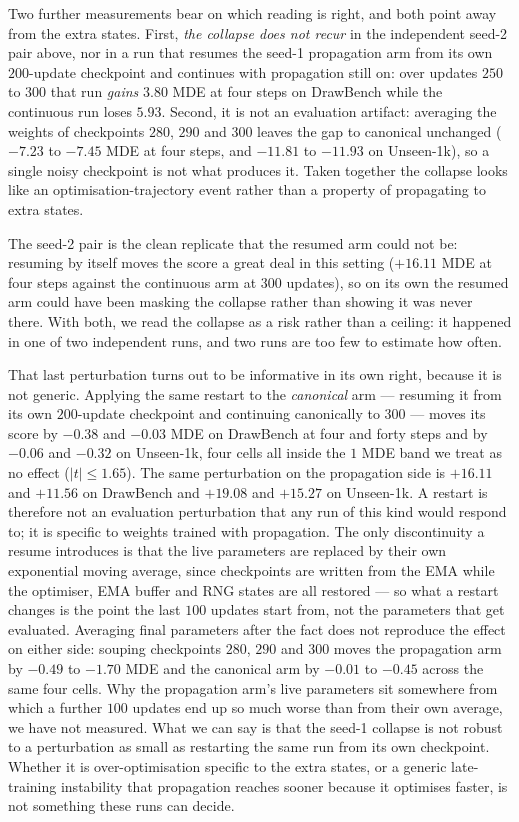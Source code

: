 Two further measurements bear on which reading is right, and both point away from the
extra states. First, \emph{the collapse does not recur} in the independent seed-2 pair above, nor in a
run that resumes the seed-1 propagation arm from its own $200$-update checkpoint and continues
with propagation still on: over updates $250$ to $300$ that run \emph{gains} $3.80$ MDE at four
steps on DrawBench while the continuous run loses $5.93$. Second, it is not an evaluation artifact: averaging the weights of checkpoints
$280$, $290$ and $300$ leaves the gap to canonical unchanged ($-7.23$ to $-7.45$ MDE at
four steps, and $-11.81$ to $-11.93$ on Unseen-1k), so a single noisy checkpoint is not what
produces it. Taken together the collapse looks like an optimisation-trajectory event rather
than a property of propagating to extra states.

The seed-2 pair is the clean replicate that the resumed arm could not be: resuming by itself
moves the score a great deal in this setting ($+16.11$ MDE at four steps against the continuous
arm at $300$ updates), so on its own the resumed arm could have been masking the collapse rather
than showing it was never there. With both, we read the collapse as a risk rather than a ceiling:
it happened in one of two independent runs, and two runs are too few to estimate how often.

That last perturbation turns out to be informative in its own right, because it is not generic.
Applying the same restart to the \emph{canonical} arm --- resuming it from its own $200$-update
checkpoint and continuing canonically to $300$ --- moves its score by $-0.38$ and $-0.03$ MDE on
DrawBench at four and forty steps and by $-0.06$ and $-0.32$ on Unseen-1k, four cells all inside
the $1$ MDE band we treat as no effect ($|t|\le1.65$). The same perturbation on the propagation
side is $+16.11$ and $+11.56$ on DrawBench and $+19.08$ and $+15.27$ on Unseen-1k. A restart is
therefore not an evaluation perturbation that any run of this kind would respond to; it is
specific to weights trained with propagation. The only discontinuity a resume introduces is that
the live parameters are replaced by their own exponential moving average, since checkpoints are
written from the EMA while the optimiser, EMA buffer and RNG states are all restored --- so what
a restart changes is the point the last $100$ updates start from, not the parameters that get
evaluated. Averaging final parameters after the fact does not reproduce the effect on either
side: souping checkpoints $280$, $290$ and $300$ moves the propagation arm by $-0.49$ to $-1.70$
MDE and the canonical arm by $-0.01$ to $-0.45$ across the same four cells. Why the propagation
arm's live parameters sit somewhere from which a further $100$ updates end up so much worse than
from their own average, we have not measured. What we can say is that the seed-1 collapse is not robust to a perturbation as small as
restarting the same run from its own checkpoint. Whether it is over-optimisation specific to the extra states, or a generic
late-training instability that propagation reaches sooner because it optimises faster, is not
something these runs can decide.

